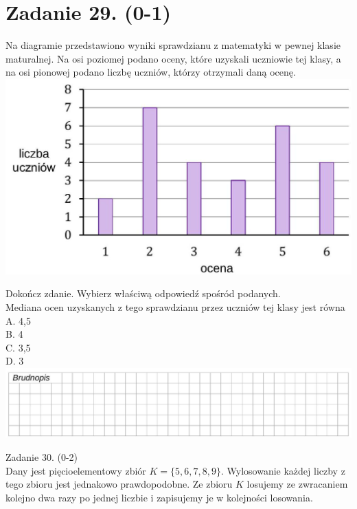 \documentclass[10pt]{article}
\begin{document}
\section*{Zadanie 29. (0-1)}
Na diagramie przedstawiono wyniki sprawdzianu z matematyki w pewnej klasie maturalnej. Na osi poziomej podano oceny, które uzyskali uczniowie tej klasy, a na osi pionowej podano liczbę uczniów, którzy otrzymali daną ocenę.\\
\includegraphics[max width=\textwidth, center]{2024_11_21_daeb5e5efb43dd4cb535g-25(1)}

Dokończ zdanie. Wybierz właściwą odpowiedź spośród podanych.\\
Mediana ocen uzyskanych z tego sprawdzianu przez uczniów tej klasy jest równa\\
A. 4,5\\
B. 4\\
C. 3,5\\
D. 3\\
\includegraphics[max width=\textwidth, center]{2024_11_21_daeb5e5efb43dd4cb535g-25}

Zadanie 30. (0-2)\\
Dany jest pięcioelementowy zbiór \(K=\{5,6,7,8,9\}\). Wylosowanie każdej liczby z tego zbioru jest jednakowo prawdopodobne. Ze zbioru \(K\) losujemy ze zwracaniem kolejno dwa razy po jednej liczbie i zapisujemy je w kolejności losowania.
\end{document}
